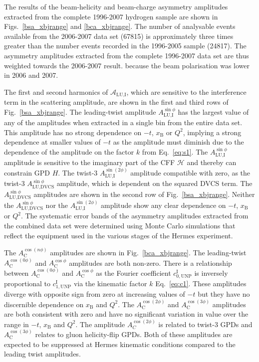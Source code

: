 The results of the beam-helicity and beam-charge asymmetry amplitudes extracted from the complete 1996-2007 hydrogen sample are shown in Figs.~\ref{bsa_xbjrange} and \ref{bca_xbjrange}. The number of analysable events available from the 2006-2007 data set (67815) is approximately three times greater than the number  events recorded in the 1996-2005 sample (24817). The  asymmetry amplitudes extracted from the complete 1996-2007 data set are thus weighted towards the 2006-2007 result.  because the beam polarisation was lower in 2006 and 2007.

The first and second harmonics of $\mathcal{A}_{\textrm{LU,I}}$, which are
sensitive to the interference term in the scattering amplitude, are shown in the first and third rows of Fig.~\ref{bsa_xbjrange}. The leading-twist amplitude $A_{\textrm{LU,I}}^{\sin\phi}$ has the largest value of any of the amplitudes when extracted in a single bin from the entire data set. This amplitude has no strong dependence on $-t$, $x_{\textrm{B}}$ or $Q^{2}$, implying a strong dependence at smaller values of $-t$ as the amplitude must diminish  due to the dependence of the amplitude on the factor $k$ from Eq.~\ref{eq:s1}. The $A_{\textrm{LU,I}}^{\sin\phi}$ amplitude is sensitive to the imaginary part of the CFF $\mathcal{H}$ and thereby can constrain GPD $\textit{H}$. The twist-3 $A_{\textrm{LU,I}}^{\sin(2\phi)}$ amplitude  compatible with zero, as  the twist-3 $A_{\textrm{LU,DVCS}}^{\sin\phi}$ amplitude, which is dependent on the squared DVCS term. The $A_{\textrm{LU,DVCS}}^{\sin\phi}$ amplitudes are shown in the second row of Fig.~\ref{bsa_xbjrange}. Neither the $A_{\textrm{LU,DVCS}}^{\sin\phi}$ nor the $A_{\textrm{LU,I}}^{\sin(2\phi)}$ amplitude show any clear dependence on $-t$, $x_{\textrm{B}}$ or $Q^{2}$. The systematic error bands of the asymmetry amplitudes extracted from the combined data set were determined using Monte Carlo simulations that reflect the equipment used in the various stages of the H{\sc ermes} experiment. 

The $A_{\textrm{C}}^{\cos(n\phi)}$ amplitudes are shown in Fig.~\ref{bca_xbjrange}. The leading-twist $A_{\textrm{C}}^{\cos(0\phi)}$ and $A_{\textrm{C}}^{\cos\phi}$ amplitudes are both non-zero. There is a relationship between $A_{\textrm{C}}^{\cos(0\phi)}$ and $A_{\textrm{C}}^{\cos\phi}$ as the Fourier coefficient $c^{\textrm{I}}_{0,\textrm{UNP}}$ is inversely proportional to $c^{\textrm{I}}_{1,\textrm{UNP}}$ via the kinematic factor $k$  Eq.~\ref{eq:c1}. These amplitudes diverge with opposite sign from zero at increasing values of $-t$ but they
have no discernible dependence on $x_{\textrm{B}}$ and $Q^{2}$. The $A_{\textrm{C}}^{\cos(2\phi)}$ and $A_{\textrm{C}}^{\cos(3\phi)}$ amplitudes are both consistent with zero and have no significant variation in value over the range in $-t$, $x_{\textrm{B}}$ and $Q^{2}$. The amplitude $A_{C}^{\cos(2\phi)}$ is related to twist-3 GPDs and $A_{\textrm{C}}^{\cos(3\phi)}$ relates to gluon helicity-flip GPDs. Both of these amplitudes are expected to be suppressed at H{\sc ermes} kinematic conditions compared to the leading twist amplitudes.

